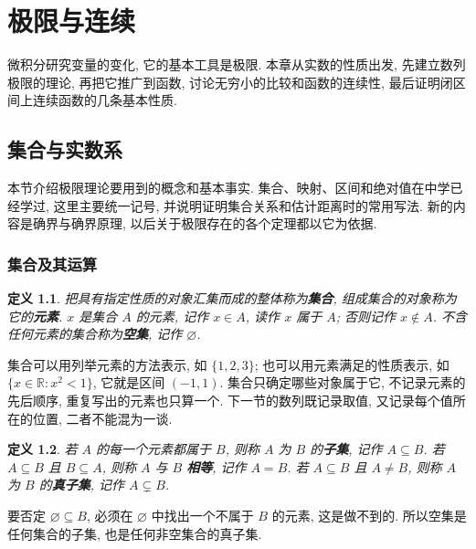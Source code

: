 \documentclass[UTF8,openany]{ctexbook}
\theoremstyle{chinesetextbook}
\newtheorem{definition}{定义}[section]
\begin{document}
\tableofcontents
\clearpage
\chapter{极限与连续}
微积分研究变量的变化, 它的基本工具是极限. 本章从实数的性质出发, 先建立数列极限的理论, 再把它推广到函数, 讨论无穷小的比较和函数的连续性, 最后证明闭区间上连续函数的几条基本性质.
\section{集合与实数系}
本节介绍极限理论要用到的概念和基本事实. 集合、映射、区间和绝对值在中学已经学过, 这里主要统一记号, 并说明证明集合关系和估计距离时的常用写法. 新的内容是确界与确界原理, 以后关于极限存在的各个定理都以它为依据.
\subsection{集合及其运算}
\begin{definition}
把具有指定性质的对象汇集而成的整体称为\textbf{集合}, 组成集合的对象称为它的\textbf{元素}. $x$ 是集合 $A$ 的元素, 记作 $x\in A$, 读作 $x$ 属于 $A$; 否则记作 $x\notin A$. 不含任何元素的集合称为\textbf{空集}, 记作 $\varnothing$.
\end{definition}
集合可以用列举元素的方法表示, 如 $\{1,2,3\}$; 也可以用元素满足的性质表示, 如 $\{x\in\mathbb R:x^2<1\}$, 它就是区间 $(-1,1)$. 集合只确定哪些对象属于它, 不记录元素的先后顺序, 重复写出的元素也只算一个. 下一节的数列既记录取值, 又记录每个值所在的位置, 二者不能混为一谈.
\begin{definition}
若 $A$ 的每一个元素都属于 $B$, 则称 $A$ 为 $B$ 的\textbf{子集}, 记作 $A\subseteq B$. 若 $A\subseteq B$ 且 $B\subseteq A$, 则称 $A$ 与 $B$ \textbf{相等}, 记作 $A=B$. 若 $A\subseteq B$ 且 $A\ne B$, 则称 $A$ 为 $B$ 的\textbf{真子集}, 记作 $A\subsetneq B$.
\end{definition}
要否定 $\varnothing\subseteq B$, 必须在 $\varnothing$ 中找出一个不属于 $B$ 的元素, 这是做不到的. 所以空集是任何集合的子集, 也是任何非空集合的真子集.
\end{document}
